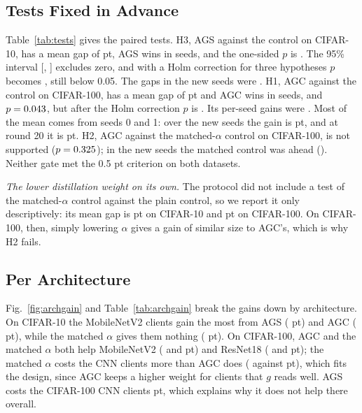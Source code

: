 \documentclass[conference]{IEEEtran}
\begin{document}
\subsection{Tests Fixed in Advance}
Table~\ref{tab:tests} gives the paired tests. H3, AGS against the control on CIFAR-10, has a mean gap of \GTenAgsCtlBest{} pt, AGS wins in \GTenAgsCtlBestWins{} seeds, and the one-sided $p$ is \GTenAgsCtlBestPone{}. The 95\% interval [\GTenAgsCtlBestLo{}, \GTenAgsCtlBestHi{}] excludes zero, and with a Holm correction for three hypotheses $p$ becomes \HolmThree{}, still below 0.05. The gaps in the new seeds were \GTenAgsCtlBestNew{}. H1, AGC against the control on CIFAR-100, has a mean gap of \GHunAgcCtlBest{} pt and AGC wins in \GHunAgcCtlBestWins{} seeds, and $p=0.043{}$, but after the Holm correction $p$ is \HolmOne{}. Its per-seed gains were \GHunAgcCtlBestSeeds{}. Most of the mean comes from seeds 0 and 1: over the new seeds the gain is \GHunAgcCtlBestNewMean{} pt, and at round 20 it is \GHunAgcCtlLast{} pt. H2, AGC against the matched-$\alpha$ control on CIFAR-100, is not supported ($p=0.325{}$); in the new seeds the matched control was ahead (\GHunAgcAmBestNew{}). Neither gate met the 0.5 pt criterion on both datasets.

\begin{table}[t]
\centering
\caption{Paired comparisons of best-round accuracy over seeds \SeedList{}. Mean gap and 95\% confidence interval in pt; $p$ from a paired $t$-test, one-sided (1s) for the hypotheses fixed in advance and two-sided (2s) otherwise; wins = seeds in which the first method is better; last column = mean gap over the new seeds only (2 and later).}
\label{tab:tests}
\footnotesize
\TabTests
\end{table}

\textit{The lower distillation weight on its own.} The protocol did not include a test of the matched-$\alpha$ control against the plain control, so we report it only descriptively: its mean gap is \GTenAmCtlBest{} pt on CIFAR-10 and \GHunAmCtlBest{} pt on CIFAR-100. On CIFAR-100, then, simply lowering $\alpha$ gives a gain of similar size to AGC's, which is why H2 fails.

\subsection{Per Architecture}
Fig.~\ref{fig:archgain} and Table~\ref{tab:archgain} break the gains down by architecture. On CIFAR-10 the MobileNetV2 clients gain the most from AGS (\GainTenAgsMob{} pt) and AGC (\GainTenAgcMob{} pt), while the matched $\alpha$ gives them nothing (\GainTenAmMob{} pt). On CIFAR-100, AGC and the matched $\alpha$ both help MobileNetV2 (\GainHunAgcMob{} and \GainHunAmMob{} pt) and ResNet18 (\GainHunAgcRes{} and \GainHunAmRes{} pt); the matched $\alpha$ costs the CNN clients more than AGC does (\GainHunAmCnn{} against \GainHunAgcCnn{} pt), which fits the design, since AGC keeps a higher weight for clients that $g$ reads well. AGS costs the CIFAR-100 CNN clients \GainHunAgsCnn{} pt, which explains why it does not help there overall.
\end{document}
